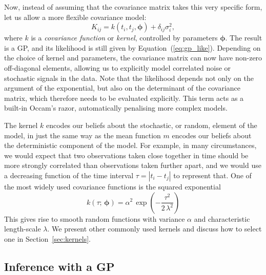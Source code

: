 \documentclass[letterpaper]{ar-1col}
\newcommand{\suz}[1]{\textcolor{magenta}{#1}}
\newcommand{\hyperparams}{\ensuremath{\boldsymbol{\phi}}}
\newcommand{\dt}{\ensuremath{\tau}}
\newcommand{\amplitude}{\ensuremath{\alpha}}
\newcommand{\lengthscale}{\ensuremath{\lambda}}
\begin{document}
Now, instead of assuming that the covariance matrix takes this very specific form, let us allow a more flexible covariance model:
\begin{equation}
  K_{ij} = k(t_i,t_j,\hyperparams) + \delta_{ij} \sigma_i^2,
\end{equation}
where $k$ is a \emph{covariance function} or \emph{kernel}, controlled by parameters $\hyperparams$. The result is a GP, and its likelihood is still given by Equation~(\ref{eq:gp_like}). Depending on the choice of kernel and parameters, the covariance matrix can now have non-zero off-diagonal elements, allowing us to explicitly model correlated noise or stochastic signals in the data.
Note that the likelihood depends not only on the argument of the exponential, but also on the determinant of the covariance matrix, which therefore needs to be evaluated explicitly. This term acts as a built-in Occam's razor, automatically penalising more complex models.

The kernel $k$ encodes our beliefs about the stochastic, or random, element of the model, in just the same way as the mean function $m$ encodes our beliefs about the deterministic component of the model. For example, in many circumstances, we would expect that two observations taken close together in time should be more strongly correlated than observations taken further apart, and we would use a decreasing function of the time interval $\dt=|t_i-t_j|$ to represent that. One of the most widely used covariance functions is the squared exponential
\begin{equation}
  k(\dt;\,\hyperparams) = \amplitude^2\,\exp\left(-\frac{\dt^2}{2\,\lengthscale^2}\right)
\end{equation}
This gives rise to smooth random functions with variance $\amplitude$ and characteristic length-scale $\lambda$. We present other commonly used kernels and discuss how to select one in Section~\ref{sec:kernels}.

\subsection{Inference with a GP}\label{sec:gp-inf}

\end{document}

